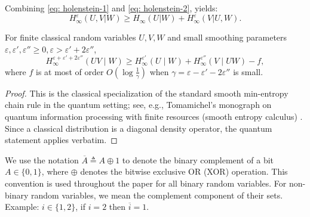 \documentclass[runningheads]{llncs}
\begin{document}
Combining \eqref{eq: holenstein-1} and \eqref{eq: holenstein-2}, yields: 
\begin{equation}\label{eq: holenstein-1 + holenstein-1}
    H^{\varepsilon}_{\infty}(U,V|W)\geq H_\infty(U|W) + H_\infty^\varepsilon(V|U,W). 
\end{equation}
\begin{lemma}\cite{Tomamichel2}\label{lemm: min-entropy vs smooth}
For finite classical random variables $U,V,W$ and small smoothing parameters
$\varepsilon,\varepsilon',\varepsilon''\ge 0, \varepsilon>\varepsilon'+2\varepsilon''$,
\begin{equation}\label{eqeq}
H_{\infty}^{\varepsilon+\varepsilon'+2\varepsilon''}(UV\mid W)
\ge
H_{\infty}^{\varepsilon'}(U\mid W)
+
H_{\infty}^{\varepsilon''}(V\mid UW)
-f,
\end{equation}
where $f$ is at most of order $O(\log \frac{1}{\gamma})$ when $\gamma = \varepsilon-\varepsilon'-2\varepsilon''$ is small. 
\end{lemma}

\begin{proof}
This is the classical specialization of the standard smooth min-entropy
chain rule in the quantum setting; see, e.g., Tomamichel's monograph on
quantum information processing with finite resources (smooth entropy
calculus) \cite{Tomamichel1,Tomamichel2}. Since a classical distribution is a diagonal density operator,
the quantum statement applies verbatim.
\end{proof}
We use the notation $\overline{A} \triangleq A \oplus 1$ to denote the binary complement of a bit $A \in \{0,1\}$, where $\oplus$ denotes the bitwise exclusive OR (XOR) operation. This convention is used throughout the paper for all binary random variables. For non-binary random variables, we mean the complement component of their sets. Example: $i \in \{1,2\}$, if $i = 2$ then $\overline{i}=1$.
\end{document}
